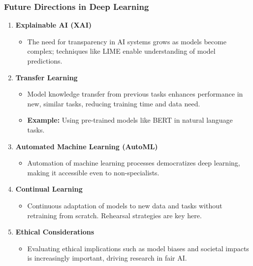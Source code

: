 \documentclass{beamer}
\begin{document}
\begin{frame}[fragile]
    \frametitle{Future Directions in Deep Learning}
    \begin{enumerate}
        \item \textbf{Explainable AI (XAI)}
            \begin{itemize}
                \item The need for transparency in AI systems grows as models become complex; techniques like LIME enable understanding of model predictions.
            \end{itemize}
        
        \item \textbf{Transfer Learning}
            \begin{itemize}
                \item Model knowledge transfer from previous tasks enhances performance in new, similar tasks, reducing training time and data need.
                \item \textbf{Example:} Using pre-trained models like BERT in natural language tasks.
            \end{itemize}
        
        \item \textbf{Automated Machine Learning (AutoML)}
            \begin{itemize}
                \item Automation of machine learning processes democratizes deep learning, making it accessible even to non-specialists.
            \end{itemize}

        \item \textbf{Continual Learning}
            \begin{itemize}
                \item Continuous adaptation of models to new data and tasks without retraining from scratch. Rehearsal strategies are key here.
            \end{itemize}

        \item \textbf{Ethical Considerations}
            \begin{itemize}
                \item Evaluating ethical implications such as model biases and societal impacts is increasingly important, driving research in fair AI.
            \end{itemize}
    \end{enumerate}
\end{frame}
\end{document}
